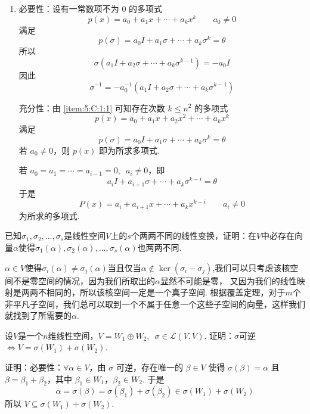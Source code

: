 \begin{exercise}
\begin{exgroup}
\begin{answer}
\begin{enumerate}
                \item 必要性：设有一常数项不为 0 的多项式
                      \[ p(x) = a_0 + a_1 x + \cdots + a_k x^k \qquad a_0 \neq 0 \]
                      满足
                      \[ p(\sigma) = a_0 I + a_1 \sigma + \cdots + a_k \sigma^k = \theta \]
                      所以
                      \[ \sigma(a_1 I + a_2 \sigma + \cdots + a_k \sigma^{k - 1}) = -a_0 I \]
                      因此
                      \[ \sigma^{-1} = -a_0^{-1} (a_1 I + a_2 \sigma + \cdots + a_k \sigma^{k - 1}) \]

                      充分性：由 \ref*{item:5:C:1:1} 可知存在次数 $ k \leqslant n^2 $ 的多项式
                      \[ p(x) = a_0 + a_1 x + a_2 x^2 + \cdots + a_k x^k \]
                      满足
                      \[ p(\sigma) = a_0 I + a_1 \sigma + \cdots + a_k \sigma^k = \theta \]
                      若 $ a_0 \neq 0 $，则 $ p(x) $ 即为所求多项式.

                      若 $ a_0 = a_1 = \cdots = a_{i - 1} = 0,\enspace a_i \neq 0 $，即
                      \[ a_i I + a_{i + 1} \sigma + \cdots + a_k \sigma^{k - i} = \theta \]
                      于是
                      \[ P(x) = a_i + a_{i + 1} x + \cdots + a_k x^{k - i} \qquad a_i \neq 0 \]
                      为所求的多项式.
            \end{enumerate}
        \end{answer}
        \item 已知$\sigma_1,\sigma_2,\ldots,\sigma_s$是线性空间$V$上的$s$个两两不同的线性变换，证明：在$V$中必存在向量$\alpha$使得$\sigma_1(\alpha),\sigma_2(\alpha),\ldots,\sigma_s(\alpha)$也两两不同.
        \begin{answer}
            $\alpha \in V$使得$\sigma_i(\alpha) \neq \sigma_j(\alpha)$当且仅当$\alpha \notin \ker(\sigma_i - \sigma_j)$,我们可以只考虑该核空间不是零空间的情况，因为我们所取出的$\alpha$显然不可能是零，
            又因为我们的线性映射是两两不相同的，所以该核空间一定是一个真子空间. 根据覆盖定理，对于$m$个非平凡子空间，我们总可以取到一个不属于任意一个这些子空间的向量，这样我们就找到了所需要的$\alpha$.
        \end{answer}
        \item 设$V$是一个$n$维线性空间，$V=W_1\oplus W_2,\enspace\sigma\in \mathcal{L}(V,V)$. 证明：$\sigma$可逆$\iff V=\sigma(W_1)+\sigma(W_2)$.
        \begin{answer}
            证明：必要性：$ \forall \alpha \in V $，由 $ \sigma $ 可逆，存在唯一的 $ \beta \in V $ 使得 $ \sigma(\beta) = \alpha $ 且 $ \beta = \beta_1 + \beta_2 $，其中 $ \beta_1 \in W_1 $，$ \beta_2 \in W_2 $. 于是
          \[ \alpha = \sigma(\beta) = \sigma(\beta_1) + \sigma(\beta_2) \in \sigma(W_1) + \sigma(W_2) \]
          所以 $ V \subseteq \sigma(W_1) + \sigma(W_2) $.


\end{answer}
\end{exgroup}
\end{exercise}
